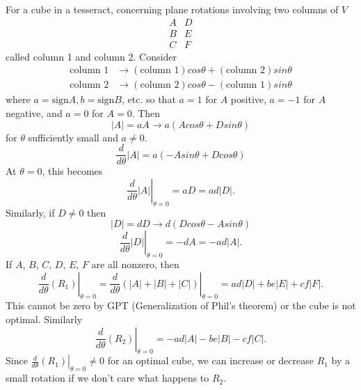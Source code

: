 For a cube in a tesseract, concerning plane rotations involving two columns of
$V$
\begin{equation*}
\begin{array}{cc}
A & D \\
B & E \\
C & F
\end{array}
\end{equation*}
called column 1 and column 2.  Consider
\begin{align*}
\text{column 1} &\rightarrow (\text{column 1}) cos\theta + (\text{column 2}) sin\theta \\
\text{column 2} &\rightarrow (\text{column 2}) cos\theta - (\text{column 1}) sin\theta
\end{align*}
where $a = \text{sign}A, b = \text{sign}B$, etc. so that $a = 1$ for $A$
positive, $a = -1$ for $A$ negative, and $a = 0$ for $A = 0$.  Then
\begin{equation*}
|A| = aA \rightarrow a(A cos\theta + D sin\theta)
\end{equation*}
for $\theta$ sufficiently small and $a \neq 0$.
\begin{equation*}
\frac{d}{d\theta}|A| = a(-A sin\theta + D cos\theta)
\end{equation*}
At $\theta = 0$, this becomes
\begin{equation*}
\left.\frac{d}{d\theta}|A|\right|_{\theta=0} = aD = ad|D|.
\end{equation*}
Similarly, if $D \neq 0$ then
\begin{equation*}
|D| = dD \rightarrow d(D cos\theta - A sin\theta)
\end{equation*}
\begin{equation*}
\left.\frac{d}{d\theta}|D|\right|_{\theta=0} = -dA = -ad|A|.
\end{equation*}
If $A$, $B$, $C$, $D$, $E$, $F$ are all nonzero, then
\begin{equation*}
\left.\frac{d}{d\theta}(R_1)\right|_{\theta=0} =
\left.\frac{d}{d\theta}(|A|+|B|+|C|)\right|_{\theta=0} =
ad|D|+be|E|+cf|F|.
\end{equation*}
This cannot be zero by GPT (Generalization of Phil's theorem) or the cube is
not optimal. Similarly
\begin{equation*}
\left.\frac{d}{d\theta}(R_2)\right|_{\theta=0} =
-ad|A|-be|B|-cf|C|.
\end{equation*}
Since $\left.\frac{d}{d\theta}(R_1)\right|_{\theta=0} \neq 0$ for an optimal
cube, we can increase or decrease $R_1$ by a small rotation if we don't care
what happens to $R_2$.

